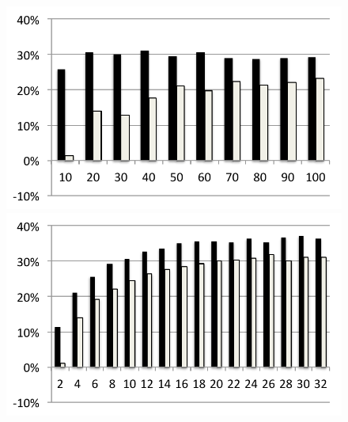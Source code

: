 \begin{figure}
  \includegraphics[width=\mywidth]{../../eval/32threads/case2it.pdf}\includegraphics[width=\mywidth]{../../eval/32threads/case2th.pdf}\\

\end{figure}
